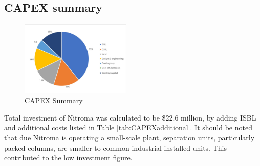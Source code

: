 \subsection{CAPEX summary}
\begin{figure}
    \vspace{-1.1cm}
    \caption{CAPEX Summary}
    \label{fig:OPEXSummary}
    \includegraphics[width=0.47\textwidth]{chapters/6-economics/figures/CAPEX_summary.jpg}
\end{figure}
Total investment of Nitroma was calculated to be \$22.6 million, by adding ISBL and additional costs listed in Table \ref{tab:CAPEXadditional}. It should be noted that due Nitroma is operating a small-scale plant, separation units, particularly packed columns, are smaller to common industrial-installed units. This contributed to the low investment figure.